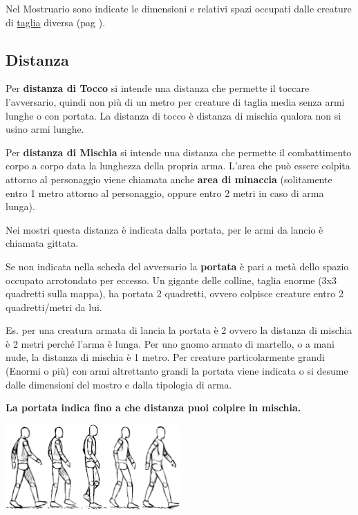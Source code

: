 \begin{multicols}{2}
Nel Mostruario sono indicate le dimensioni e relativi spazi occupati dalle creature di \hyperlink{tagliaedimensioni}{taglia} diversa (pag \pageref{tagliaedimensioni}).

\subsection{Distanza}\label{distanza}

Per \textbf{distanza di Tocco}  si intende una distanza che permette il toccare l'avversario, quindi non più di un metro per creature di taglia media senza armi lunghe o con portata. La distanza di tocco è distanza di mischia qualora non si usino armi lunghe.

Per \textbf{distanza di Mischia}  si intende una distanza che permette il combattimento corpo a corpo data la lunghezza della propria arma. L'area che può essere colpita attorno al personaggio viene chiamata anche \textbf{area di minaccia} (solitamente entro 1 metro attorno al personaggio, oppure entro 2 metri in caso di arma lunga).

Nei mostri questa distanza è indicata dalla portata, per le armi da lancio è chiamata gittata.

Se non indicata nella scheda del avversario la \textbf{portata} è pari a metà dello spazio occupato arrotondato per eccesso. Un gigante delle colline, taglia enorme (3x3 quadretti sulla mappa), ha portata 2 quadretti, ovvero colpisce creature entro 2 quadretti/metri da lui.

\begin{narratore}
Es. per una creatura armata di lancia la portata è 2 ovvero la distanza di mischia è 2 metri perché l'arma è lunga. Per uno gnomo armato di martello, o a mani nude, la distanza di mischia è 1 metro. Per creature particolarmente grandi (Enormi o più) con armi altrettanto grandi la portata viene indicata o si desume dalle dimensioni del mostro e dalla tipologia di arma.

\textbf{La portata indica fino a che distanza puoi colpire in mischia.}
\end{narratore}

\end{multicols}

\vfill

\begin{center}
	\includegraphics[width=0.5\textwidth]{immagini/camminata.png}
\end{center}

